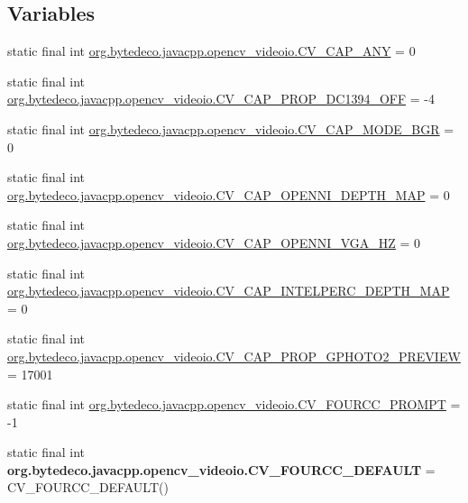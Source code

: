 \subsection*{Variables}
\begin{DoxyCompactItemize}
\item 
static final int \hyperlink{group__videoio__c_gab170df7f9f17e64c3642fbc2036c9d89}{org.\+bytedeco.\+javacpp.\+opencv\+\_\+videoio.\+C\+V\+\_\+\+C\+A\+P\+\_\+\+A\+NY} = 0
\item 
static final int \hyperlink{group__videoio__c_gab93e06d5b7823b93b958bffc1d6c5220}{org.\+bytedeco.\+javacpp.\+opencv\+\_\+videoio.\+C\+V\+\_\+\+C\+A\+P\+\_\+\+P\+R\+O\+P\+\_\+\+D\+C1394\+\_\+\+O\+FF} = -\/4
\item 
static final int \hyperlink{group__videoio__c_ga857b3fa265775f5d402c1e0a65ef254d}{org.\+bytedeco.\+javacpp.\+opencv\+\_\+videoio.\+C\+V\+\_\+\+C\+A\+P\+\_\+\+M\+O\+D\+E\+\_\+\+B\+GR} = 0
\item 
static final int \hyperlink{group__videoio__c_ga0614006f7159a4f38a5536d9afc6c841}{org.\+bytedeco.\+javacpp.\+opencv\+\_\+videoio.\+C\+V\+\_\+\+C\+A\+P\+\_\+\+O\+P\+E\+N\+N\+I\+\_\+\+D\+E\+P\+T\+H\+\_\+\+M\+AP} = 0
\item 
static final int \hyperlink{group__videoio__c_ga21913880c4cae25d1ff392c5fa2bb30f}{org.\+bytedeco.\+javacpp.\+opencv\+\_\+videoio.\+C\+V\+\_\+\+C\+A\+P\+\_\+\+O\+P\+E\+N\+N\+I\+\_\+\+V\+G\+A\+\_\+HZ} = 0
\item 
static final int \hyperlink{group__videoio__c_ga24a1e5be05c39075c7d1f8564521f733}{org.\+bytedeco.\+javacpp.\+opencv\+\_\+videoio.\+C\+V\+\_\+\+C\+A\+P\+\_\+\+I\+N\+T\+E\+L\+P\+E\+R\+C\+\_\+\+D\+E\+P\+T\+H\+\_\+\+M\+AP} = 0
\item 
static final int \hyperlink{group__videoio__c_ga6e1f35a3b8dc5ab0fc4b7363821533d8}{org.\+bytedeco.\+javacpp.\+opencv\+\_\+videoio.\+C\+V\+\_\+\+C\+A\+P\+\_\+\+P\+R\+O\+P\+\_\+\+G\+P\+H\+O\+T\+O2\+\_\+\+P\+R\+E\+V\+I\+EW} = 17001
\item 
static final int \hyperlink{group__videoio__c_gaa801d0075e64846c5f858fafb7f7ba26}{org.\+bytedeco.\+javacpp.\+opencv\+\_\+videoio.\+C\+V\+\_\+\+F\+O\+U\+R\+C\+C\+\_\+\+P\+R\+O\+M\+PT} = -\/1
\item 
\mbox{\label{group__videoio__c_ga107689adcd0470b72cf332c44348b37b}} 
static final int {\bfseries org.\+bytedeco.\+javacpp.\+opencv\+\_\+videoio.\+C\+V\+\_\+\+F\+O\+U\+R\+C\+C\+\_\+\+D\+E\+F\+A\+U\+LT} = C\+V\+\_\+\+F\+O\+U\+R\+C\+C\+\_\+\+D\+E\+F\+A\+U\+LT()
\end{DoxyCompactItemize}
